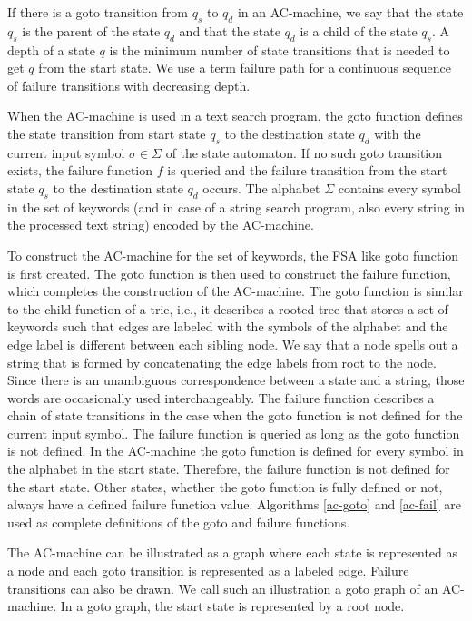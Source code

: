 \documentclass[english,twoside,censored,csm,algorithms-track-2020]{HYthesisML}
\theoremstyle{plain}
\theoremstyle{definition}
\begin{document}
If there is a goto transition from $q_s$ to $q_d$ in an AC-machine, we say that the state $q_s$ is the parent
of the state $q_d$ and that the state $q_d$ is a child of the state $q_s$. A depth of a state $q$ is the
minimum number of state transitions that is needed to get $q$ from the start state. 
We use a term failure path for a continuous sequence of failure transitions with decreasing depth.

When the AC-machine is used in a text search program,
the goto function defines the state transition from start state $q_s$ to the destination state
$q_d$ with the current input symbol $\sigma\in \Sigma$ of the state automaton. If no such
goto transition exists,
the failure function $f$ is queried and the failure transition from the start state $q_s$ to
the destination state $q_d$ occurs. The alphabet $\Sigma$ contains every symbol in the set of
keywords (and in case of a string search program, also every string in the processed text string)
encoded by the AC-machine.

To construct the AC-machine for the set of keywords, the \textsc{FSA} like goto function is first
created. The goto function is then used to construct the failure function, which completes the
construction of the AC-machine. The goto function is similar to the child function of a trie,
i.e., it describes a rooted tree that stores a set of keywords such that edges are labeled with the
symbols of the alphabet and the edge label is different between each sibling node. We say that a node
spells out a string that is formed by concatenating the edge labels from root to the node.
Since there is an unambiguous correspondence between a state and a string, those words are occasionally
used interchangeably.
The failure function describes a chain of state transitions in the case when the goto function is not defined
for the current input symbol. The failure function is queried as long as the goto function is not defined.
In the AC-machine the goto function is defined for every symbol in the alphabet in the start state.
Therefore, the failure function is not defined for the start state. Other states, whether the
goto function is fully defined or not, always have a defined failure function value.
Algorithms \ref{ac-goto} and \ref{ac-fail} are used as complete definitions of the goto and
failure functions. 

The AC-machine can be illustrated as a graph where each state is represented as a node and each
goto transition is represented as a labeled edge. Failure transitions can also be drawn. We call
such an illustration a goto graph of an AC-machine. In a goto graph, the start state is represented by
a root node.
\end{document}

